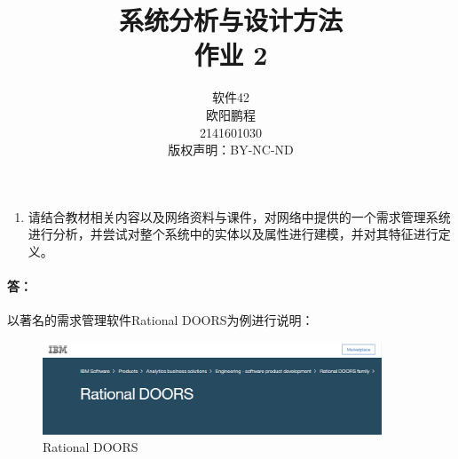 \documentclass[UTF8]{ctexart}
\title{系统分析与设计方法 \\ 作业 2}
\author{软件42 \\ 欧阳鹏程 \\ 2141601030 \\ 版权声明：BY-NC-ND}
\begin{document}
\maketitle

\begin{enumerate}
	\item
	请结合教材相关内容以及网络资料与课件，对网络中提供的一个需求管理系统进行分析，并尝试对整个系统中的实体以及属性进行建模，并对其特征进行定义。
\end{enumerate}
	\paragraph{答：} 以著名的需求管理软件Rational DOORS为例进行说明：
		\begin{figure}[H]
		\centering
		\includegraphics[width=0.9\textwidth]{1.png}
		\caption{Rational DOORS}
	\end{figure}
\end{document}
